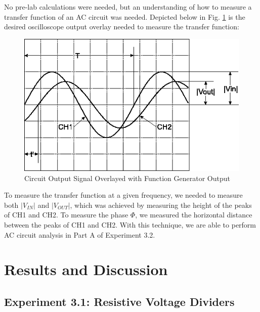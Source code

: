 \documentclass[10pt]{article}
\begin{document}
No pre-lab calculations were needed, but an understanding of how to measure a transfer function of an AC circuit was needed. Depicted below in Fig. \ref{measurement} is the desired oscilloscope output overlay needed to measure the transfer function:
\begin{centering}
	\begin{figure} [H]
		\centering
		\includegraphics[scale=0.5]{images/measurementexample.png}
		\caption{Circuit Output Signal Overlayed with Function Generator Output}
		\label{measurement}
	\end{figure}
\end{centering}

To measure the transfer function at a given frequency, we needed to measure both $|V_{IN}|$ and $|V_{OUT}|$, which was achieved by measuring the height of the peaks of CH1 and CH2. To measure the phase $\Phi$, we measured the horizontal distance between the peaks of CH1 and CH2. With this technique, we are able to perform AC circuit analysis in Part A of Experiment 3.2. 
\medskip


\section{Results and Discussion}

\subsection{Experiment 3.1: Resistive Voltage Dividers}
\end{document}
